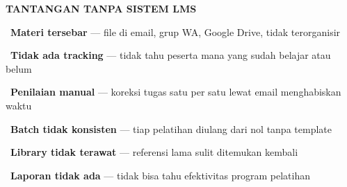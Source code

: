 \documentclass[a4paper]{article}
\begin{document}
\noindent
\begin{minipage}[t]{0.485\textwidth}
    \colorbox{RedLight}{%
        \begin{minipage}{\dimexpr\textwidth-2\fboxsep\relax}
            {\fontsize{10}{13}\selectfont\bfseries\color{RedText} TANTANGAN TANPA SISTEM LMS}
        \end{minipage}}\par
    \vspace{4pt}

    {\fontsize{9.5}{13}\selectfont\color{TextDark}%
    \textbullet\ \textbf{Materi tersebar} --- file di email, grup WA, Google Drive, tidak terorganisir\par\vspace{4pt}%
    \textbullet\ \textbf{Tidak ada tracking} --- tidak tahu peserta mana yang sudah belajar atau belum\par\vspace{4pt}%
    \textbullet\ \textbf{Penilaian manual} --- koreksi tugas satu per satu lewat email menghabiskan waktu\par\vspace{4pt}%
    \textbullet\ \textbf{Batch tidak konsisten} --- tiap pelatihan diulang dari nol tanpa template\par\vspace{4pt}%
    \textbullet\ \textbf{Library tidak terawat} --- referensi lama sulit ditemukan kembali\par\vspace{4pt}%
    \textbullet\ \textbf{Laporan tidak ada} --- tidak bisa tahu efektivitas program pelatihan}%
\end{minipage}%
\hfill%
\end{document}
